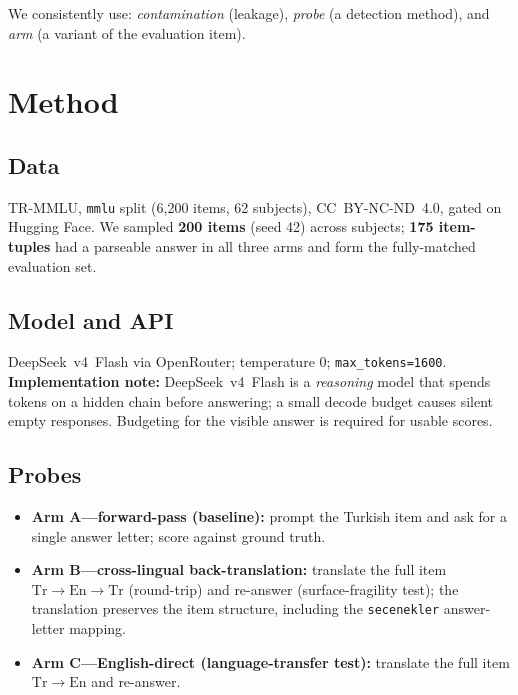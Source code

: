 \documentclass[11pt]{article}
\begin{document}
We consistently use: \emph{contamination} (leakage), \emph{probe} (a detection method), and \emph{arm} (a variant of the evaluation item).

\section{Method}

\subsection{Data}
TR-MMLU, \texttt{mmlu} split (6{,}200 items, 62 subjects), CC~BY-NC-ND~4.0, gated on Hugging Face. We sampled \textbf{200 items} (seed 42) across subjects; \textbf{175 item-tuples} had a parseable answer in all three arms and form the fully-matched evaluation set.

\subsection{Model and API}
DeepSeek~v4~Flash via OpenRouter; temperature 0; \texttt{max\_tokens=1600}. \textbf{Implementation note:} DeepSeek~v4~Flash is a \emph{reasoning} model that spends tokens on a hidden chain before answering; a small decode budget causes silent empty responses. Budgeting for the visible answer is required for usable scores.

\subsection{Probes}
\begin{itemize}
\item \textbf{Arm A---forward-pass (baseline):} prompt the Turkish item and ask for a single answer letter; score against ground truth.
\item \textbf{Arm B---cross-lingual back-translation:} translate the full item $\mathrm{Tr}\rightarrow\mathrm{En}\rightarrow\mathrm{Tr}$ (round-trip) and re-answer (surface-fragility test); the translation preserves the item structure, including the \texttt{secenekler} answer-letter mapping.
\item \textbf{Arm C---English-direct (language-transfer test):} translate the full item $\mathrm{Tr}\rightarrow\mathrm{En}$ and re-answer.
\end{itemize}
\end{document}
